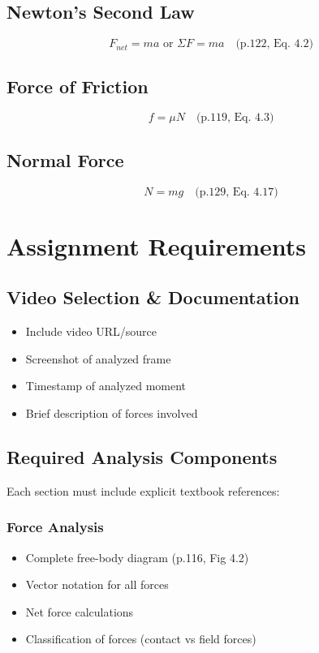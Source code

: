 \documentclass[12pt]{article}
\begin{document}
\subsection{Newton's Second Law}
\begin{equation}
F_{net} = ma \text{ or } \Sigma F = ma \quad \text{(p.122, Eq. 4.2)}
\end{equation}

\subsection{Force of Friction}
\begin{equation}
f = \mu N \quad \text{(p.119, Eq. 4.3)}
\end{equation}

\subsection{Normal Force}
\begin{equation}
N = mg \quad \text{(p.129, Eq. 4.17)}
\end{equation}

\section{Assignment Requirements}

\subsection{Video Selection \& Documentation}
\begin{itemize}
\item Include video URL/source
\item Screenshot of analyzed frame
\item Timestamp of analyzed moment
\item Brief description of forces involved
\end{itemize}

\subsection{Required Analysis Components}
Each section must include explicit textbook references:

\subsubsection{Force Analysis}
\begin{itemize}
\item Complete free-body diagram (p.116, Fig 4.2)
\item Vector notation for all forces
\item Net force calculations
\item Classification of forces (contact vs field forces)
\end{itemize}
\end{document}
